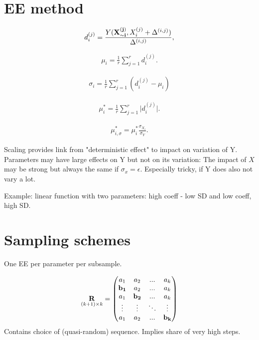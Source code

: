 \documentclass[a4paper,12pt]{article}
\begin{document}
\newpage %

\section{EE method}
\begin{align} \label{eq:EE}
d_i^{(j)} =  \frac{Y(\bold{X_{\sim i}^{(j)}}, X_i^{(j)} + \Delta^{(i,j)})}{\Delta^{(i,j)}},
\end{align}

\begin{align}
\mu_i = \frac{1}{r} \sum_{j=1}^{r} d_i^{(j)}.
\end{align}


\begin{align}
\sigma_i = \frac{1}{r} \sum_{j=1}^{r} (d_i^{(j)} - \mu_i)
\end{align}


\begin{align}
\mu_i^* = \frac{1}{r} \sum_{j=1}^{r} \big| d_i^{(j)} \big|.
\end{align}

\begin{align}
\mu_{i,\sigma}^* = \mu_i^* \frac{\sigma_{X_i}}{\sigma_Y}.
\end{align}

Scaling provides link from "deterministic effect" to impact on variation of Y. Parameters may have large effects on Y but not on its variation: The impact of $X$ may be strong but always the same if $\sigma_x=\epsilon$.  Especially tricky, if Y does also not vary a lot.

Example: linear function with two parameters: high coeff - low SD and low coeff, high SD.

\newpage


\section{Sampling schemes}

One EE per parameter per subsample.

\begin{align}
\underset{(k+1)\times k}{\bold{R}} =
\begin{pmatrix}
a_1 & a_2 & ... & a_k \\
\bold{b_1} & a_2 & ... & a_k \\
a_1 & \bold{b_2} & ... & a_k \\
\vdots & \vdots & 	\ddots & \vdots\\
a_1 & a_2 & ... & \bold{b_k}
\end{pmatrix}
\end{align}
\noindent
Contains choice of (quasi-random) sequence. Implies share of very high steps.
\end{document}
